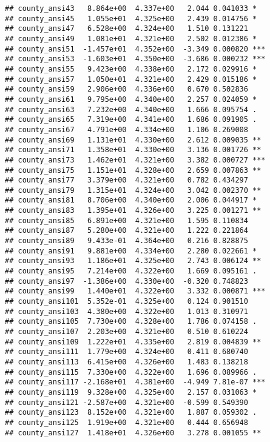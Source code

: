 \documentclass[
]{book}
\begin{document}
\begin{verbatim}
## county_ansi43   8.864e+00  4.337e+00   2.044 0.041033 *  
## county_ansi45   1.055e+01  4.325e+00   2.439 0.014756 *  
## county_ansi47   6.528e+00  4.324e+00   1.510 0.131221    
## county_ansi49   1.081e+01  4.321e+00   2.502 0.012386 *  
## county_ansi51  -1.457e+01  4.352e+00  -3.349 0.000820 ***
## county_ansi53  -1.603e+01  4.350e+00  -3.686 0.000232 ***
## county_ansi55   9.423e+00  4.338e+00   2.172 0.029916 *  
## county_ansi57   1.050e+01  4.321e+00   2.429 0.015186 *  
## county_ansi59   2.906e+00  4.336e+00   0.670 0.502836    
## county_ansi61   9.795e+00  4.340e+00   2.257 0.024059 *  
## county_ansi63   7.232e+00  4.340e+00   1.666 0.095754 .  
## county_ansi65   7.319e+00  4.341e+00   1.686 0.091905 .  
## county_ansi67   4.791e+00  4.334e+00   1.106 0.269008    
## county_ansi69   1.131e+01  4.330e+00   2.612 0.009035 ** 
## county_ansi71   1.358e+01  4.330e+00   3.136 0.001726 ** 
## county_ansi73   1.462e+01  4.321e+00   3.382 0.000727 ***
## county_ansi75   1.151e+01  4.328e+00   2.659 0.007863 ** 
## county_ansi77   3.379e+00  4.321e+00   0.782 0.434297    
## county_ansi79   1.315e+01  4.324e+00   3.042 0.002370 ** 
## county_ansi81   8.706e+00  4.340e+00   2.006 0.044917 *  
## county_ansi83   1.395e+01  4.326e+00   3.225 0.001271 ** 
## county_ansi85   6.891e+00  4.321e+00   1.595 0.110834    
## county_ansi87   5.280e+00  4.321e+00   1.222 0.221864    
## county_ansi89   9.433e-01  4.364e+00   0.216 0.828875    
## county_ansi91   9.881e+00  4.334e+00   2.280 0.022661 *  
## county_ansi93   1.186e+01  4.325e+00   2.743 0.006124 ** 
## county_ansi95   7.214e+00  4.322e+00   1.669 0.095161 .  
## county_ansi97  -1.386e+00  4.330e+00  -0.320 0.748823    
## county_ansi99   1.440e+01  4.322e+00   3.332 0.000871 ***
## county_ansi101  5.352e-01  4.325e+00   0.124 0.901510    
## county_ansi103  4.380e+00  4.322e+00   1.013 0.310971    
## county_ansi105  7.730e+00  4.328e+00   1.786 0.074158 .  
## county_ansi107  2.203e+00  4.321e+00   0.510 0.610224    
## county_ansi109  1.222e+01  4.335e+00   2.819 0.004839 ** 
## county_ansi111  1.779e+00  4.324e+00   0.411 0.680740    
## county_ansi113  6.415e+00  4.326e+00   1.483 0.138218    
## county_ansi115  7.330e+00  4.322e+00   1.696 0.089966 .  
## county_ansi117 -2.168e+01  4.381e+00  -4.949 7.81e-07 ***
## county_ansi119  9.328e+00  4.325e+00   2.157 0.031063 *  
## county_ansi121 -2.587e+00  4.321e+00  -0.599 0.549390    
## county_ansi123  8.152e+00  4.321e+00   1.887 0.059302 .  
## county_ansi125  1.919e+00  4.321e+00   0.444 0.656948    
## county_ansi127  1.418e+01  4.326e+00   3.278 0.001055 ** 

\end{verbatim}
\end{document}

